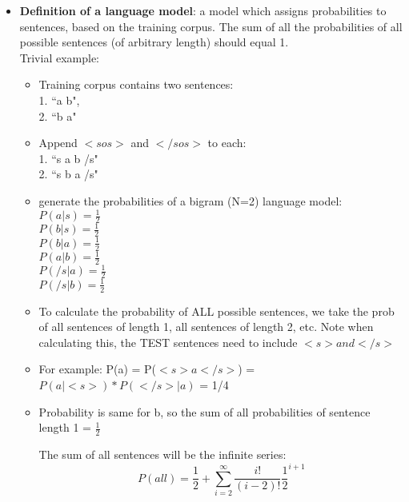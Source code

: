 \documentclass[]{article}
\begin{document}
\begin{itemize}
		\item \textbf{Definition of a language model}: a model which assigns probabilities to sentences, based on the training corpus. The sum of all the probabilities of all possible sentences (of arbitrary length) should equal 1. \\ 
			
			Trivial example:
			\begin{itemize}
				\item Training corpus contains two sentences: \\ 
				1. ``a b", \\ 
				2. ``b a"
				
				\item Append $<sos>$ and $</sos>$ to each: \\
				1. ``s a b /s" 
				\\ 2. ``s b a /s"
				
				\item generate the probabilities of a bigram (N=2) language model: \\
				
				$P(a | s) = \frac{1}{2}$ \\
				$P(b | s) = \frac{1}{2}$ \\
				$P(b | a) = \frac{1}{2}$ \\
				$P(a | b) = \frac{1}{2}$ \\
				$P(/s | a) = \frac{1}{2}$ \\
				$P(/s | b) = \frac{1}{2}$ \\
				
				\item To calculate the probability of ALL possible sentences, we take the prob of all sentences of length 1, all sentences of length 2, etc. Note when calculating this, the TEST sentences need to include $<s> and </s>$
				
				\item For example: P(a) = P($<s> a </s>$) = $P(a | <s>) * P(</s> | a)$ = 1/4
				
				\item Probability is same for b, so the sum of all probabilities of sentence length 1 = $\frac{1}{2}$
				
				The sum of all sentences will be the infinite series: \\
				
				$$P(all) = \frac{1}{2} + \sum_{i=2}^{\infty} \frac{i!}{(i-2)!} \frac{1}{2} ^ {i + 1}$$ \\
				

\end{itemize}
\end{itemize}
\end{document}
